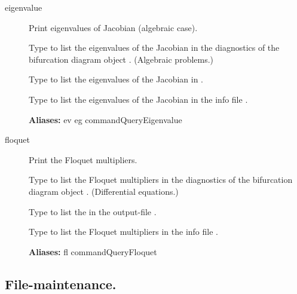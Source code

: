 \documentclass[12pt]{report}
\begin{document}
\begin{description}
\item[eigenvalue]
Print eigenvalues of Jacobian (algebraic case).

    Type  to list the eigenvalues of the Jacobian 
    in the diagnostics of the bifurcation diagram object .
    (Algebraic problems.)

    Type  to list the eigenvalues of the Jacobian 
    in . 

    Type  to list the eigenvalues of the Jacobian 
    in the info file .
    
\textbf{Aliases:} ev eg commandQueryEigenvalue

\item[floquet]
Print the Floquet multipliers.

    Type  to list the Floquet multipliers
    in the diagnostics of the bifurcation diagram object .
    (Differential equations.)

    Type  to list the 
    in the output-file . 

    Type  to list the Floquet multipliers 
    in the info file .
    
\textbf{Aliases:} fl commandQueryFloquet
\end{description}

\subsection{File-maintenance.} \label{sec:clui_ref_filemaint}
\end{document}
